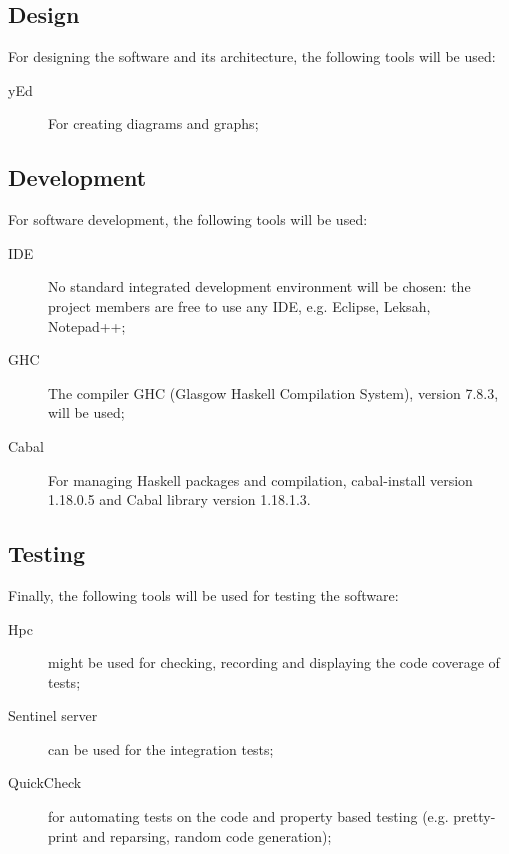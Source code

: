 \subsection{Design}
%
For designing the software and its architecture, the following tools will be used:
\begin{description}
	\item[yEd] For creating diagrams and graphs;
\end{description}

\subsection{Development}
%
%
%
For software development, the following tools will be used:
\begin{description}
	\item[IDE] No standard integrated development environment will be chosen: the project members are free to use any IDE, e.g. Eclipse, Leksah, Notepad++;
	\item[GHC] The compiler GHC (Glasgow Haskell Compilation System), version 7.8.3, will be used;
	\item[Cabal] For managing Haskell packages and compilation, cabal-install version 1.18.0.5 and Cabal library version 1.18.1.3.
\end{description}

\subsection{Testing}
%
%
%
Finally, the following tools will be used for testing the software:
\begin{description}
	\item[Hpc] might be used for checking, recording and displaying the code coverage of tests;
	\item[Sentinel server] can be used for the integration tests;
	\item[QuickCheck] for automating tests on the code and property based testing (e.g. pretty-print and reparsing, random code generation);
\end{description}
